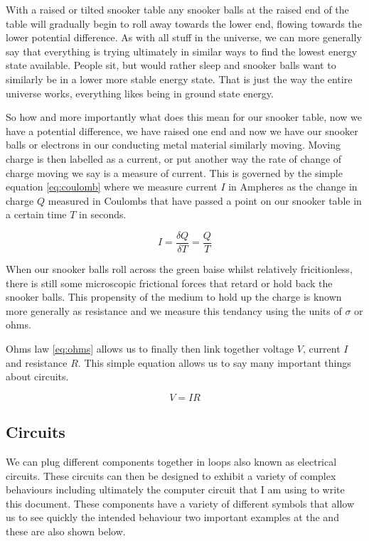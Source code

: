 With a raised or tilted snooker table any snooker balls at the raised end of the table will gradually begin to roll away towards the lower end, flowing towards the lower potential difference. As with all stuff in the universe, we can more generally say that everything is trying ultimately in similar ways to find the lowest energy state available. People sit, but would rather sleep and snooker balls want to similarly be in a lower more stable energy state. That is just the way the entire universe works, everything likes being in ground state energy. 

So how and more importantly what does this mean for our snooker table, now we have a potential difference, we have raised one end and now we have our snooker balls or electrons in our conducting metal material similarly moving. Moving charge is then labelled as a current, or put another way the rate of change of charge moving we say is a measure of current. This is governed by the simple equation \eqref{eq:coulomb} where we measure current $I$ in Ampheres as the change in charge $Q$ measured in Coulombs that have passed a point on our snooker table in a certain time $T$ in seconds. 

\begin{equation}
 I = \frac{\delta Q}{\delta T} = \frac{Q}{T}
\label{eq:coulomb}
\end{equation}

When our snooker balls roll across the green baise whilst relatively fricitionless, there is still some microscopic frictional forces that retard or hold back the snooker balls. This propensity of the medium to hold up the charge is known more generally as resistance and we measure this tendancy using the units of $\sigma$ or ohms. 

Ohms law \eqref{eq:ohms} allows us to finally then link together voltage $V$, current $I$ and resistance $R$. This simple equation allows us to say many important things about circuits.

\begin{equation}
 V = IR
\label{eq:ohms}
\end{equation}

\subsection{Circuits}

We can plug different components together in loops also known as electrical circuits. These circuits can then be designed to exhibit a variety of complex behaviours including ultimately the computer circuit that I am using to write this document. These components have a variety of different symbols that allow us to see quickly the intended behaviour two important examples at the  and  these are also shown below.

